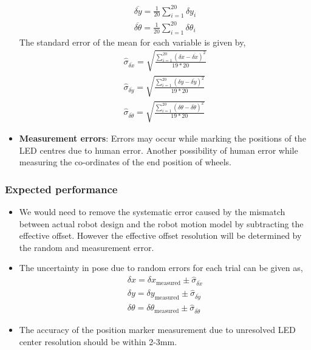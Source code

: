 \documentclass[11pt,a4paper,openright,twoside]{extreport}
\begin{document}
\begin{itemize}
\begin{align*}
\overline{\delta y} = \frac{1}{20} \sum_{i=1}^{20} \delta y_i \\
\overline{\delta \theta} = \frac{1}{20} \sum_{i=1}^{20} \delta \theta_i
\end{align*}
The standard error of the mean for each variable is given by,
\begin{align*}
\hat{\sigma}_{\overline{\delta x}} = \sqrt{\frac{\sum_{i=1}^{20} (\delta x - \overline{\delta x})^2}{19 * 20}} \\
\hat{\sigma}_{\overline{\delta y}} = \sqrt{\frac{\sum_{i=1}^{20} (\delta y - \overline{\delta y})^2}{19 * 20}} \\
\hat{\sigma}_{\overline{\delta \theta}} = \sqrt{\frac{\sum_{i=1}^{20} (\delta \theta - \overline{\delta \theta})^2}{19 * 20}}
\end{align*}

\item \textbf{Measurement errors}: Errors may occur while marking the positions of the LED centres due to human error. Another possibility of human error while measuring the co-ordinates of the end position of wheels.   

\end{itemize}


\subsubsection*{Expected performance}
\begin{itemize}
\item We would need to remove the systematic error caused by the mismatch between actual robot design and the robot motion model by subtracting the effective offset. However the effective offset resolution will be determined by the random and measurement error.
\item The uncertainty in pose due to random errors for each trial can be given as,
\begin{align*}
\delta x = \delta x_{\text{measured}} \pm \hat{\sigma}_{\overline{\delta x}} \\
\delta y = \delta y_{\text{measured}} \pm \hat{\sigma}_{\overline{\delta y}} \\
\delta \theta = \delta \theta_{\text{measured}} \pm \hat{\sigma}_{\overline{\delta \theta}}
\end{align*}
\item The accuracy of the position marker measurement due to unresolved LED center resolution should be within 2-3mm.
\end{itemize}

\end{document}
